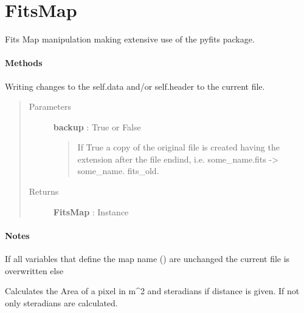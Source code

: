 \documentclass[a4paper,10pt,english]{sphinxmanual}
\begin{document}
\section{FitsMap}
\label{maps:fitsmap}

\begin{fulllineitems}
\label{maps:astrolyze.maps.fits.FitsMap}
Fits Map manipulation making extensive use of the
pyfits package.
\paragraph{Methods}

\begin{fulllineitems}
\label{maps:astrolyze.maps.fits.FitsMap.update_file}
Writing changes to the self.data and/or self.header to the current
file.
\begin{quote}\begin{description}
\item[{Parameters }] \leavevmode
\textbf{backup} : True or False
\begin{quote}

If True a copy of the original file is created having the extension
 after the file endind, i.e. some\_name.fits -\textgreater{} some\_name.
fits\_old.
\end{quote}

\item[{Returns }] \leavevmode
\textbf{FitsMap} : Instance

\end{description}\end{quote}
\paragraph{Notes}

If all variables that define the map name () are unchanged the current
file is overwritten else

\end{fulllineitems}


\begin{fulllineitems}
\label{maps:astrolyze.maps.fits.FitsMap.get_pixel_size}
Calculates the Area of a pixel in m\textasciicircum{}2 and steradians if distance
is given. If not only  steradians are calculated.


\end{fulllineitems}
\end{fulllineitems}
\end{document}
